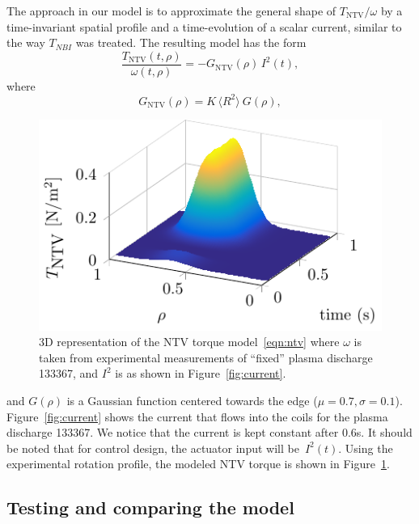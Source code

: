 \documentclass[12pt,lot, lof]{puthesis}
\begin{document}
The approach in our model is to approximate the general shape of $T_\text{NTV}/\omega$ by a time-invariant spatial profile and a time-evolution of a scalar current, similar to the way $T_{NBI}$ was treated. The resulting model has the form  
\begin{equation}
   \frac{T_\text{NTV}(t,\rho)}{\omega(t,\rho)} = - G_\text{NTV}  (\rho) \, I^2(t),
\end{equation}
where
\begin{equation}
G_\text{NTV}  (\rho) = K \,  \langle R^2 \rangle \:G(\rho),
\end{equation}
%
\begin{figure}
\centering
\includegraphics[width=0.7 \linewidth]{fig7}
\caption{3D representation of the NTV torque model~\eqref{eqn:ntv} where
  $\omega$ is taken from experimental measurements of ``fixed'' plasma discharge
  133367, and $I^2$ is as shown in Figure~\ref{fig:current}.}
\label{TNTV3D}
\end{figure}
%
and $G(\rho)$ is a Gaussian function centered towards the edge ($\mu =0.7, \sigma =0.1$).
%
Figure~{\ref{fig:current}} shows the current that flows into the coils
for the plasma discharge 133367. We notice that the current is kept constant
after $0.6$s. It should be noted that for control design, the actuator input
will be~$I^2(t)$.
%
Using the experimental rotation profile, the modeled NTV torque is shown in Figure~\ref{TNTV3D}.

\subsection{Testing and comparing the model}
\label{sec:test-comp-model}
\end{document}
